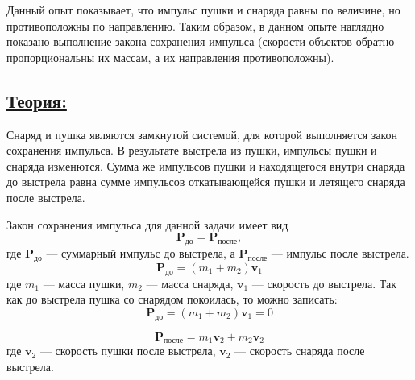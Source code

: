 \documentclass[14pt,a4paper,oneside]{extarticle}	%
\begin{document}
Данный опыт показывает, что импульс пушки и снаряда равны по величине, но противоположны по направлению.
Таким образом, в данном опыте наглядно показано выполнение закона сохранения импульса (скорости объектов обратно пропорциональны их массам, а их направления противоположны).

\subsection*{\underline{Теория:}}

Снаряд и пушка являются замкнутой системой, для которой выполняется закон сохранения импульса. 
В результате выстрела из пушки, импульсы пушки и снаряда изменются.
Сумма же импульсов пушки и находящегося внутри снаряда до выстрела равна сумме импульсов откатывающейся пушки и летящего снаряда после выстрела.

Закон сохранения импульса для данной задачи имеет вид 
\begin{equation}\label{cannon-eq1}
 \textbf{P}_{\text{до}} = \textbf{P}_{\text{после}},
\end{equation}
где $ \textbf{P}_{\text{до}} $ — суммарный импульс до выстрела, а $ \textbf{P}_{\text{после}} $ — импульс после выстрела. 
\begin{equation}\label{cannon-eq2}
\textbf{P}_{\text{до}} = (m_{1} + m_{2})\textbf{v}_{1}
\end{equation}
где $ m_{1} $ — масса пушки, $ m_{2} $ — масса снаряда, $ \textbf{v}_{1} $ — скорость до выстрела.
Так как до выстрела пушка со снарядом покоилась, то можно записать: 
\begin{equation}\label{cannon-eq3}
\textbf{P}_{\text{до}} = (m_{1} + m_{2})\textbf{v}_{1} = 0
\end{equation}

\begin{equation}\label{cannon-eq4}
\textbf{P}_{\text{после}} = m_{1}\textbf{v}_{2} + m_{2}\textbf{v}_{2} 
\end{equation}
где $ \textbf{v}_{2} $ — скорость пушки после выстрела, $ \textbf{v}_{2} $ — скорость снаряда после выстрела.
\end{document}
